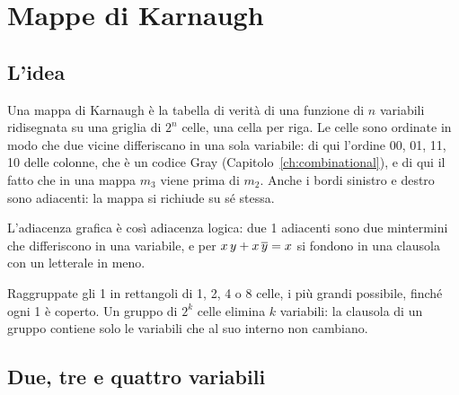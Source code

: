 \section{Mappe di Karnaugh}

\subsection{L'idea}

Una mappa di Karnaugh è la tabella di verità di una funzione di $n$ variabili
ridisegnata su una griglia di $2^{n}$ celle, una cella per riga. Le celle sono
ordinate in modo che due vicine differiscano in una sola variabile: di qui
l'ordine 00, 01, 11, 10 delle colonne, che è un codice Gray
(Capitolo~\ref{ch:combinational}), e di qui il fatto che in una mappa $m_3$
viene prima di $m_2$. Anche i bordi sinistro e destro sono adiacenti: la mappa
si richiude su sé stessa.

L'adiacenza grafica è così adiacenza logica: due 1 adiacenti sono due
mintermini che differiscono in una variabile, e per $x\,y+x\,\overline{y}=x$ si
fondono in una clausola con un letterale in meno.

\begin{prgconcept}
Raggruppate gli 1 in rettangoli di 1, 2, 4 o 8 celle, i più grandi possibile,
finché ogni 1 è coperto. Un gruppo di $2^{k}$ celle elimina $k$ variabili: la
clausola di un gruppo contiene solo le variabili che al suo interno non
cambiano.
\end{prgconcept}

\subsection{Due, tre e quattro variabili}

